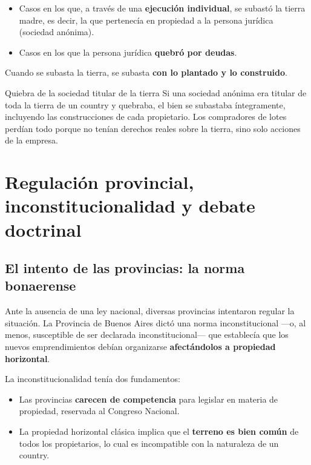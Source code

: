 \documentclass[12pt,oneside]{book}
\begin{document}
\begin{itemize}
    \item Casos en los que, a través de una \textbf{ejecución individual}, se subastó la tierra madre, es decir, la que pertenecía en propiedad a la persona jurídica (sociedad anónima).
    \item Casos en los que la persona jurídica \textbf{quebró por deudas}.
\end{itemize}

Cuando se subasta la tierra, se subasta \textbf{con lo plantado y lo construido}.

\begin{example}{Quiebra de la sociedad titular de la tierra}
Si una sociedad anónima era titular de toda la tierra de un country y quebraba, el bien se subastaba íntegramente, incluyendo las construcciones de cada propietario. Los compradores de lotes perdían todo porque no tenían derechos reales sobre la tierra, sino solo acciones de la empresa.
\end{example}

\chapter[Regulación provincial y debate doctrinal]{Regulación provincial, inconstitucionalidad y debate doctrinal}

\section{El intento de las provincias: la norma bonaerense}

Ante la ausencia de una ley nacional, diversas provincias intentaron regular la situación. La Provincia de Buenos Aires dictó una norma inconstitucional ---o, al menos, susceptible de ser declarada inconstitucional--- que establecía que los nuevos emprendimientos debían organizarse \textbf{afectándolos a propiedad horizontal}.

La inconstitucionalidad tenía dos fundamentos:

\begin{itemize}
    \item Las provincias \textbf{carecen de competencia} para legislar en materia de propiedad, reservada al Congreso Nacional.
    \item La propiedad horizontal clásica implica que el \textbf{terreno es bien común} de todos los propietarios, lo cual es incompatible con la naturaleza de un country.
\end{itemize}
\end{document}
